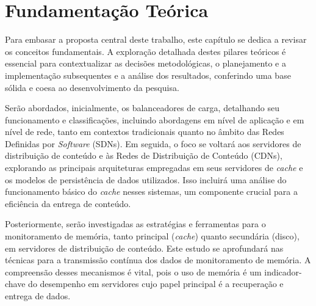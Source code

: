 

\chapter{Fundamentação Teórica} \label{cap:FundamentacaoTeorica}

Para embasar a proposta central deste trabalho, este capítulo se dedica a revisar os conceitos fundamentais. A exploração detalhada destes pilares teóricos é essencial para contextualizar as decisões metodológicas, o planejamento e a implementação subsequentes e a análise dos resultados, conferindo uma base sólida e coesa ao desenvolvimento da pesquisa.

Serão abordados, inicialmente, os balanceadores de carga, detalhando seu funcionamento e classificações, incluindo abordagens em nível de aplicação e em nível de rede, tanto em contextos tradicionais quanto no âmbito das Redes Definidas por \textit{Software} (SDNs). Em seguida, o foco se voltará aos servidores de distribuição de conteúdo e às Redes de Distribuição de Conteúdo (CDNs), explorando as principais arquiteturas empregadas em seus servidores de \textit{cache} e os modelos de persistência de dados utilizados. Isso incluirá uma análise do funcionamento básico do \textit{cache} nesses sistemas, um componente crucial para a eficiência da entrega de conteúdo.

Posteriormente, serão investigadas as estratégias e ferramentas para o monitoramento de memória, tanto principal (\textit{cache}) quanto secundária (disco), em servidores de distribuição de conteúdo. Este estudo se aprofundará nas técnicas para a transmissão contínua dos dados de monitoramento de memória. A compreensão desses mecanismos é vital, pois o uso de memória é um indicador-chave do desempenho em servidores cujo papel principal é a recuperação e entrega de dados.

